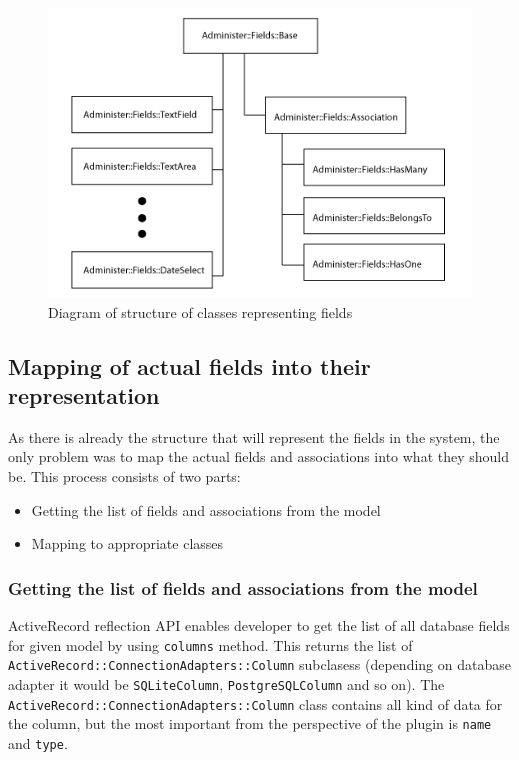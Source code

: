       \begin{figure}[hbt!]
    		\begin{center}
    			\includegraphics[width=0.8\linewidth]{images/chapter05/fields01.png}
    			\caption{Diagram of structure of classes representing fields}
    			\label{fields01}
    		\end{center}
    	\end{figure}
    
    \subsection{Mapping of actual fields into their representation}
      As there is already the structure that will represent the fields in the system, the only problem was to 
      map the actual fields and associations into what they should be. This process consists of two parts:
        \begin{itemize}
          \item Getting the list of fields and associations from the model
          \item Mapping to appropriate classes
        \end{itemize}

      \subsubsection{Getting the list of fields and associations from the model}
        ActiveRecord reflection API enables developer to get the list of all database fields for given
        model by using \texttt{columns} method. This returns the list of \texttt{ActiveRecord::ConnectionAdapters::Column}
        subclasess (depending on database adapter it would be \texttt{SQLiteColumn}, \texttt{PostgreSQLColumn} and so on).
        The \texttt{ActiveRecord::ConnectionAdapters::Column} class contains all kind of data for the column, but the most
        important from the perspective of the plugin is \texttt{name} and \texttt{type}. 
        
